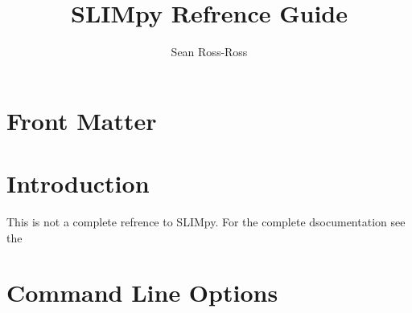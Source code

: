 \documentclass{manual}
\author{Sean Ross-Ross }
\title{SLIMpy Refrence Guide}
\begin{document}
\maketitle



\ifhtml
\chapter*{Front Matter\label{front}}
\fi







\chapter{ Introduction }

\begin{notice} [note] 
This is not a complete refrence to SLIMpy. For the complete dsocumentation see the
\end{notice}

\chapter{Command Line Options}
	
\end{document}
